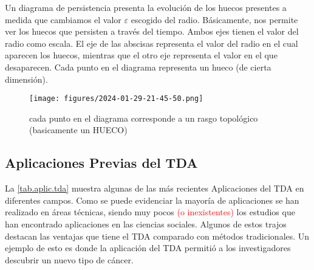 \documentclass[a4paper,11pt]{article}
\newcommand{\red}[1]{\textcolor{red}{#1}}
\begin{document}
Un diagrama de persistencia presenta la evolución de los huecos presentes a medida que cambiamos el valor \(\varepsilon\) escogido del radio. Básicamente, nos permite ver los huecos que persisten a través del tiempo. Ambos ejes tienen el valor del radio como escala. El eje de las abscisas representa el valor del radio en el cual aparecen los huecos, mientras que el otro eje representa el valor en el que desaparecen. Cada punto en el diagrama representa un hueco (de cierta dimensión). 


\begin{figure}[!htb]
    \centering
    \texttt{[image: figures/2024-01-29-21-45-50.png]}
    \caption{cada punto en el diagrama corresponde a un rasgo topológico (basicamente un HUECO) }%
\end{figure}



\subsection{Aplicaciones Previas del TDA}

La \autoref{tab.aplic.tda} muestra  algunas de las más recientes Aplicaciones del  TDA en diferentes campos. 
Como se puede evidenciar la mayoría de aplicaciones se han realizado en áreas técnicas, siendo muy pocos \red{(o inexistentes)} los estudios que han encontrado aplicaciones en las ciencias sociales. Algunos de estos trajos destacan las ventajas que tiene  el TDA comparado con métodos tradicionales. Un ejemplo de esto es \cite{Nicolau11} donde la aplicación del TDA permitió a los investigadores descubrir un nuevo tipo de cáncer.
\end{document}
